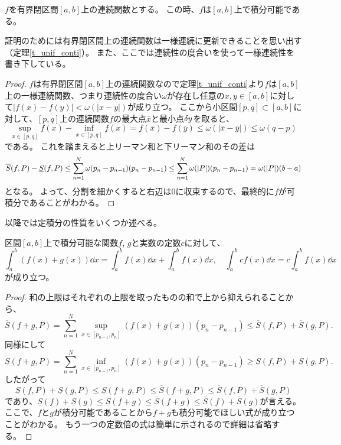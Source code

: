 \begin{theorem}[連続関数の可積分性]
$f$を有界閉区間$[a, b]$上の連続関数とする。
この時、$f$は$[a, b]$上で積分可能である。
\end{theorem}

証明のためには有界閉区間上の連続関数は一様連続に更新できることを思い出す（定理\ref{t_unif_conti}）。
また、ここでは連続性の度合いを使って一様連続性を書き下している。

\begin{proof}
$f$は有界閉区間$[a, b]$上の連続関数なので定理\ref{t_unif_conti}より$f$は$[a, b]$上の一様連続関数、つまり連続性の度合い$\omega$が存在し任意の$x, y \in [a, b]$に対して$|f(x)-f(y)| < \omega(|x-y|)$が成り立つ。
ここから小区間$[p, q] \subset [a, b]$に対して、$[p, q]$上の連続関数$f$の最大点$\bar{x}$と最小点$\var{y}$を取ると、
$$
\sup_{x \in [p, q]}f(x)-\inf_{x \in [p, q]}f(x) = f(\bar{x})-f(\bar{y}) \le \omega(|\bar{x}-\bar{y}|) \le \omega(q-p)
$$
である。
これを踏まえると上リーマン和と下リーマン和のその差は
$$
\overline{S}(f, P)-\underline{S}(f, P)
\le \sum_{n = 1}^N \omega(p_n-p_{n-1})(p_n-p_{n-1})
\le \sum_{n = 1}^N \omega(\abs{P})(p_n-p_{n-1})
= \omega(\abs{P})(b-a)
$$
となる。
よって、分割を細かくすると右辺は$0$に収束するので、最終的に$f$が可積分であることがわかる。
\end{proof}

以降では定積分の性質をいくつか述べる。

\begin{proposition}[積分の線形性]
区間$[a, b]$上で積分可能な関数$f$, $g$と実数の定数$c$に対して、
$$
\int_a^b (f(x)+g(x))\dd{x} = \int_a^b f(x)\dd{x}+\int_a^b f(x)\dd{x},
\quad \int_a^b c f(x)\dd{x} = c\int_a^b f(x)\dd{x}
$$
が成り立つ。
\end{proposition}

\begin{proof}
和の上限はそれぞれの上限を取ったものの和で上から抑えられることから、
$$
\overline{S}(f+g, P) = \sum_{n = 1}^N \sup_{x \in [p_{n-1}, p_n]}(f(x)+g(x))(p_n-p_{n-1}) \le \overline{S}(f, P)+\overline{S}(g, P).
$$
同様にして
$$
\underline{S}(f+g, P) = \sum_{n = 1}^N \inf_{x \in [p_{n-1}, p_n]}(f(x)+g(x))(p_n-p_{n-1}) \ge \underline{S}(f, P)+\underline{S}(g, P).
$$
したがって
$$
\underline{S}(f, P)+\underline{S}(g, P) \le \underline{S}(f+g, P) \le \overline{S}(f+g, P) \le \overline{S}(f, P)+\overline{S}(g, P)
$$
であり、$\underline{S}(f)+\underline{S}(g) \le \underline{S}(f+g) \le \overline{S}(f+g) \le \overline{S}(f)+\overline{S}(g)$が言える。
ここで、$f$と$g$が積分可能であることから$f+g$も積分可能でほしい式が成り立つことがわかる。
もう一つの定数倍の式は簡単に示されるので詳細は省略する。
\end{proof}

